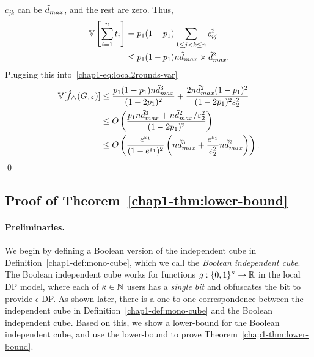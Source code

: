 {  %
  $c_{jk}$ 
  can be $\tilde{d}_{max}$, and the rest are zero. Thus,
  \begin{align*}
    \mathbb{V}\left[\sum_{i=1}^n t_i \right] &=
    p_1(1-p_1) \sum_{1 \leq j < k \leq n} c_{ij}^2 \\ 
    &\leq p_1(1-p_1) n\tilde{d}_{max} \times \tilde{d}_{max}^2.
  \end{align*}
  Plugging this into~\eqref{chap1-eq:local2rounds-var}
  \begin{align*}
    \mathbb{V}[\hat{f}_\triangle(G,\varepsilon)] &\leq \frac{p_1(1-p_1)n\tilde{d}_{max}^3}{(1-2p_1)^2} +
    \frac{2n\tilde{d}_{max}^2(1-p_1)^2}{(1-2p_1)^2\varepsilon_2^2} \\
    &\leq O\left(\frac{p_1 n\tilde{d}_{max}^3 + n\tilde{d}_{max}^2/\varepsilon_2^2}{(1-2p_1)^2} \right) \\
    &\leq O\left(\frac{e^{\varepsilon_1}}{(1-e^{\varepsilon_1})^2} \left(n\tilde{d}_{max}^3 +
    \frac{e^{\varepsilon_1}}{\varepsilon_2^2}n\tilde{d}_{max}^2\right)\right).
  \end{align*}
  \qed

\subsection{Proof of Theorem~\ref{chap1-thm:lower-bound}}
\label{chap1-sub:proof_thm_lower-bound}

\paragraph{Preliminaries.}
We begin by defining a Boolean version of the independent cube in Definition~\ref{chap1-def:mono-cube}, which we call the \textit{Boolean independent cube}. 
The Boolean independent cube 
works for functions $g : \{0,1\}^\kappa \rightarrow \mathbb{R}$ in the local DP model, where each of $\kappa \in \mathbb{N}$ users has a \textit{single bit} and obfuscates the bit to provide $\epsilon$-DP. 
As shown later, there is a one-to-one correspondence between the independent cube in Definition~\ref{chap1-def:mono-cube} and the Boolean independent cube. 
Based on this, we show a lower-bound for the Boolean independent cube, and use the lower-bound to prove Theorem~\ref{chap1-thm:lower-bound}.

}
